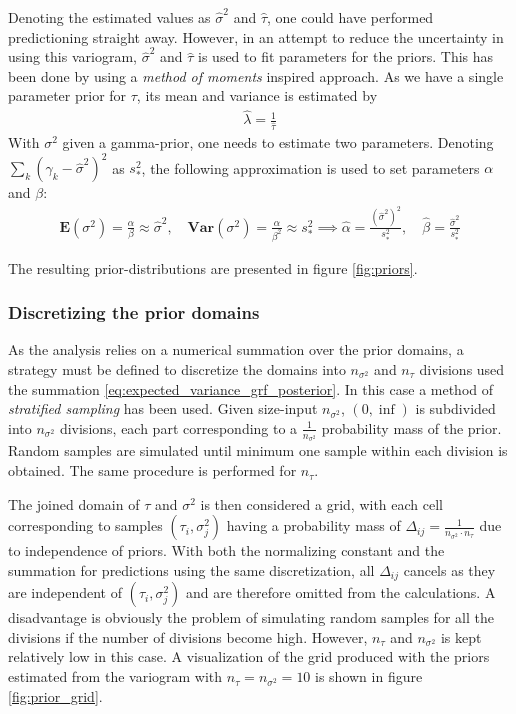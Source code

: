Denoting the estimated values as $\hat{\sigma}^2$ and $\hat{\tau}$, one could have performed predictioning straight away. However, in an attempt to reduce the uncertainty in using this variogram, $\hat{\sigma}^2$ and $\hat{\tau}$ is used to fit parameters for the priors. This has been done by using a \textit{method of moments} inspired approach. As we have a single parameter prior for $\tau$, its mean and variance is estimated by 
\begin{align}
\hat{\lambda} = \frac{1}{\hat{\tau}}
\end{align}
With $\sigma^2$ given a gamma-prior, one needs to estimate two parameters. Denoting $\sum_k (\gamma_k - \hat{\sigma}^2)^2$ as $s_*^2$, the following approximation is used to set parameters $\alpha$ and $\beta$:
\begin{align}
\mathbf{E}(\sigma^2) = \frac{\alpha}{\beta} \approx \hat{\sigma}^2, \quad
\mathbf{Var}(\sigma^2) = \frac{\alpha}{\beta^2} \approx s_*^2 
\implies 
\hat{\alpha} = \frac{(\hat{\sigma}^2)^2}{s_*^2}, \quad  \hat{\beta} = \frac{\hat{\sigma}^2}{s_*^2}
\end{align}

The resulting prior-distributions are presented in figure \ref{fig:priors}.

\subsubsection{Discretizing the prior domains}
As the analysis relies on a numerical summation over the prior domains, a strategy must be defined to discretize the domains into $n_{\sigma^2}$ and $n_{\tau}$ divisions used the summation \ref{eq:expected_variance_grf_posterior}. In this case a method of \textit{stratified sampling} has been used. Given size-input $n_{\sigma^2}$, $(0,\inf)$ is subdivided into $n_{\sigma^2}$ divisions, each part corresponding to a $\frac{1}{n_{\sigma^2}}$ probability mass of the prior. Random samples are simulated until minimum one sample within each division is obtained. The same procedure is performed for $n_{\tau}$. 

The joined domain of $\tau$ and $\sigma^2$ is then considered a grid, with each cell corresponding to samples $(\tau_i, \sigma_j^2)$ having a probability mass of $\Delta_{ij} = \frac{1}{n_{\sigma^2} \cdot n_{\tau}}$ due to independence of priors. With both the normalizing constant and the summation for predictions using the same discretization, all $\Delta_{ij}$ cancels as they are independent of $(\tau_i, \sigma_j^2)$ and are therefore omitted from the calculations. A disadvantage is obviously the problem of simulating random samples for all the divisions if the number of divisions become high. However, $n_{\tau}$ and $n_{\sigma^2}$ is kept relatively low in this case. A visualization of the grid produced with the priors estimated from the variogram with $n_{\tau} = n_{\sigma^2} = 10$ is shown in figure \ref{fig:prior_grid}. 

